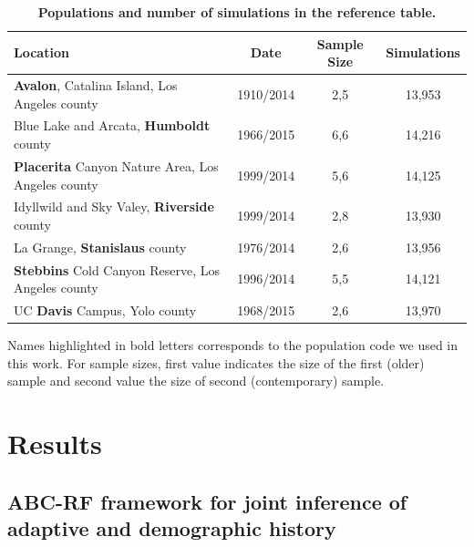 \documentclass[a4paper, 12pt]{article}
\begin{document}
\begin{table}[!ht]
 \caption{\textbf{Populations and number of simulations in the reference table.}}
  \centering
  \begin{tabular}{lccc}
   \cmidrule(r){1-4}
    Location                                                  &Date      &Sample Size   &Simulations \\
    \midrule               
    \textbf{Avalon}, Catalina Island, Los Angeles county      &1910/2014 &2,5 &13,953      \\ 
    Blue Lake and Arcata, \textbf{Humboldt} county            &1966/2015 &6,6 &14,216      \\ 
    \textbf{Placerita} Canyon Nature Area, Los Angeles county &1999/2014 &5,6 &14,125      \\ 
    Idyllwild and Sky Valey, \textbf{Riverside} county        &1999/2014 &2,8 &13,930      \\ 
    La Grange, \textbf{Stanislaus} county                     &1976/2014 &2,6 &13,956      \\ 
    \textbf{Stebbins} Cold Canyon Reserve, Los Angeles county &1996/2014 &5,5 &14,121      \\ 
    UC \textbf{Davis} Campus, Yolo county                     &1968/2015 &2,6 &13,970      \\ 
    \bottomrule
  \end{tabular}
  \begin{tablenotes}
      \small
      \item Names highlighted in bold letters corresponds to the population code we used in this work. For sample sizes, first value indicates the size of the first (older) sample and second value the size of second (contemporary) sample.
  
  \end{tablenotes}
  \label{tab:feralbees}
\end{table}

\section*{Results}

\subsection*{ABC-RF framework for joint inference of adaptive and demographic history}
\end{document}
